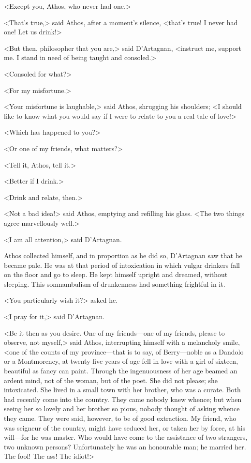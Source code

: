 <Except you, Athos, who never had one.> 

<That's true,> said Athos, after a moment's silence, <that's true! I never had one! Let us drink!> 

<But then, philosopher that you are,> said D'Artagnan, <instruct me, support me. I stand in need of being taught and consoled.> 

<Consoled for what?> 

<For my misfortune.> 

<Your misfortune is laughable,> said Athos, shrugging his shoulders; <I should like to know what you would say if I were to relate to you a real tale of love!> 

<Which has happened to you?> 

<Or one of my friends, what matters?> 

<Tell it, Athos, tell it.> 

<Better if I drink.> 

<Drink and relate, then.> 

<Not a bad idea!> said Athos, emptying and refilling his glass. <The two things agree marvellously well.> 

<I am all attention,> said D'Artagnan. 

Athos collected himself, and in proportion as he did so, D'Artagnan saw that he became pale. He was at that period of intoxication in which vulgar drinkers fall on the floor and go to sleep. He kept himself upright and dreamed, without sleeping. This somnambulism of drunkenness had something frightful in it. 

<You particularly wish it?> asked he. 

<I pray for it,> said D'Artagnan. 

<Be it then as you desire. One of my friends—one of my friends, please to observe, not myself,> said Athos, interrupting himself with a melancholy smile, <one of the counts of my province—that is to say, of Berry—noble as a Dandolo or a Montmorency, at twenty-five years of age fell in love with a girl of sixteen, beautiful as fancy can paint. Through the ingenuousness of her age beamed an ardent mind, not of the woman, but of the poet. She did not please; she intoxicated. She lived in a small town with her brother, who was a curate. Both had recently come into the country. They came nobody knew whence; but when seeing her so lovely and her brother so pious, nobody thought of asking whence they came. They were said, however, to be of good extraction. My friend, who was seigneur of the country, might have seduced her, or taken her by force, at his will—for he was master. Who would have come to the assistance of two strangers, two unknown persons? Unfortunately he was an honourable man; he married her. The fool! The ass! The idiot!> 

